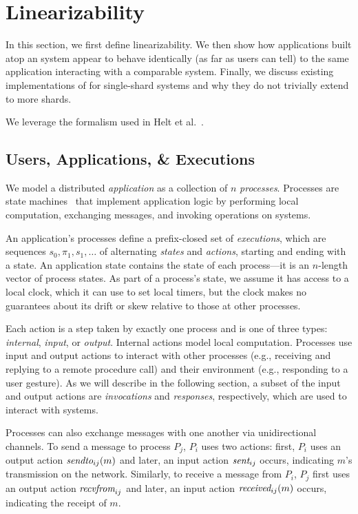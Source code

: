 \section{\Multidispatch{} Linearizability}
\label{sec:mdl}

In this section, we first define \multidispatch{} linearizability.
We then show how applications built atop an \MDL{} system appear
to behave identically (as far as users can tell) to the same application interacting
with a comparable \SDL{} system. Finally, we discuss existing implementations
of \MDL{} for single-shard systems and why they do not trivially extend to more
shards.

We leverage the formalism used in Helt et al.~\cite{helt2021rss}.

\subsection{Users, Applications, \& Executions}
\label{sec:mdl:applications}

We model a distributed \textit{application} as a collection of $n$
\textit{processes}. Processes are state machines~\cite{lynch1987ioa,lynch1996da}
that implement application logic by performing local computation, exchanging
messages, and invoking operations on systems.

An application's processes define a prefix-closed set of \textit{executions},
which are sequences $s_0,\pi_1,s_1,\ldots$ of alternating \textit{states} and
\textit{actions}, starting and ending with a state. An application state
contains the state of each process---it is an $n$-length vector of process
states. As part of a process's state, we assume it has access to a local
clock, which it can use to set local timers, but the clock makes no guarantees
about its drift or skew relative to those at other processes.

Each action is a step taken by exactly one process and is one of three types:
\textit{internal}, \textit{input}, or \textit{output}. Internal actions model
local computation. Processes use input and output actions to interact with other
processes (e.g., receiving and replying to a remote procedure call) and their
environment (e.g., responding to a user gesture). As we will describe in the
following section, a subset of the input and output actions are
\textit{invocations} and \textit{responses}, respectively, which are used to
interact with systems.

Processes can also exchange messages with one another via unidirectional
channels. To send a message to process $P_j$, $P_i$ uses two actions: first,
$P_i$ uses an output action $\operatorname*{\operatorname*{\textit{sendto}}}_{ij}(m)$ and later, an input action
$\operatorname*{\textit{sent}}_{ij}$ occurs, indicating $m$'s transmission on the network. Similarly, to receive a
message from $P_i$, $P_j$ first uses an output action $\operatorname*{\textit{recvfrom}}_{ij}$ and later,
an input action $\operatorname*{\textit{received}}_{ij}(m)$ occurs, indicating the receipt of $m$.

